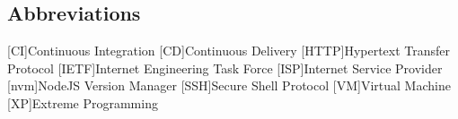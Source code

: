 \newcommand{\abbr}{Abbreviations}
\subsection{Abbreviations}

\begin{acronym}[1234567890abcd]		%
\setlength{\itemsep}{-\parsep}	%

[CI]{Continuous Integration}
[CD]{Continuous Delivery}
[HTTP]{Hypertext Transfer Protocol}
[IETF]{Internet Engineering Task Force}
[ISP]{Internet Service Provider}
[nvm]{NodeJS Version Manager}
[SSH]{Secure Shell Protocol}
[VM]{Virtual Machine}
[XP]{Extreme Programming}
\end{acronym}